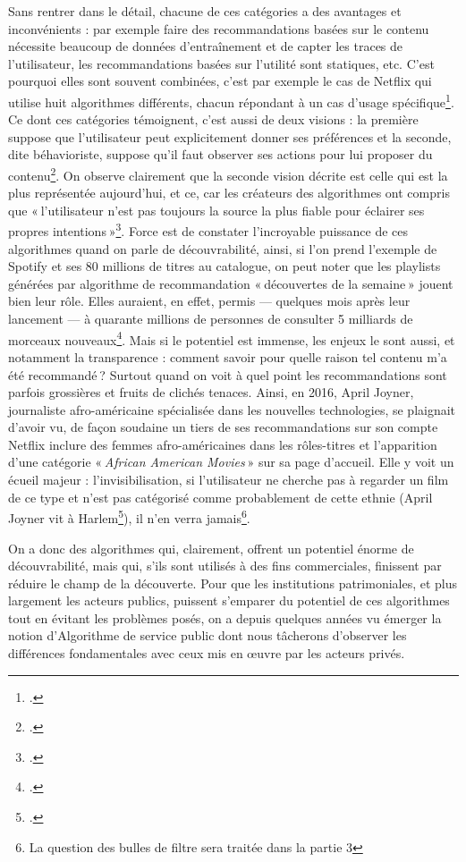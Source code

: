 Sans rentrer dans le détail, chacune de ces catégories a des avantages et inconvénients : par exemple faire des recommandations basées sur le contenu nécessite beaucoup de données d’entraînement et de capter les traces de l’utilisateur, les recommandations basées sur l’utilité sont statiques, etc. C’est pourquoi elles sont souvent combinées, c’est par exemple le cas de Netflix qui utilise huit algorithmes différents, chacun répondant à un cas d’usage spécifique\footcite[p. 47]{claes2022}. Ce dont ces catégories témoignent, c’est aussi de deux visions : la première suppose que l’utilisateur peut explicitement donner ses préférences et la seconde, dite béhavioriste, suppose qu’il faut observer ses actions pour lui proposer du contenu\footcite[p. 38]{claes2022}. On observe clairement que la seconde vision décrite est celle qui est la plus représentée aujourd’hui, et ce, car les créateurs des algorithmes ont compris que « l’utilisateur n’est pas toujours la source la plus fiable pour éclairer ses propres intentions »\footcite[p. 39]{claes2022}. Force est de constater l’incroyable puissance de ces algorithmes quand on parle de découvrabilité, ainsi, si l’on prend l’exemple de Spotify et ses 80 millions de titres au catalogue, on peut noter que les playlists générées par algorithme de recommandation « découvertes de la semaine » jouent bien leur rôle. Elles auraient, en effet, permis — quelques mois après leur lancement — à quarante millions de personnes de consulter 5 milliards de morceaux nouveaux\footcite[§ 2]{durand_chapitre_2016-1}. Mais si le potentiel est immense, les enjeux le sont aussi, et notamment la transparence : comment savoir pour quelle raison tel contenu m’a été recommandé ? Surtout quand on voit à quel point les recommandations sont parfois grossières et fruits de clichés tenaces. Ainsi, en 2016, April Joyner, journaliste afro-américaine spécialisée dans les nouvelles technologies, se plaignait d’avoir vu, de façon soudaine un tiers de ses recommandations sur son compte Netflix inclure des femmes afro-américaines dans les rôles-titres et l’apparition d’une catégorie « \textit{African American Movies} » sur sa page d’accueil. Elle y voit un écueil majeur : l’invisibilisation, si l’utilisateur ne cherche pas à regarder un film de ce type et n’est pas catégorisé comme probablement de cette ethnie (April Joyner vit à Harlem\footcite{2017}), il n’en verra jamais\footnote{La question des bulles de filtre sera traitée dans la partie 3}.

On a donc des algorithmes qui, clairement, offrent un potentiel énorme de découvrabilité, mais qui, s’ils sont utilisés à des fins commerciales, finissent par réduire le champ de la découverte. Pour que les institutions patrimoniales, et plus largement les acteurs publics, puissent s’emparer du potentiel de ces algorithmes tout en évitant les problèmes posés, on a depuis quelques années vu émerger la notion d’Algorithme de service public dont nous tâcherons d’observer les différences fondamentales avec ceux mis en œuvre par les acteurs privés.




